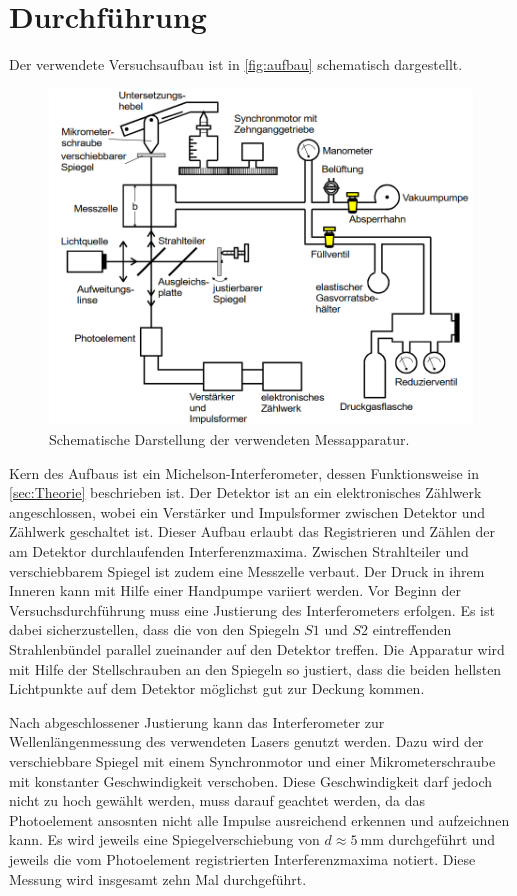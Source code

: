\section{Durchführung}
\label{sec:Durchführung}

Der verwendete Versuchsaufbau ist in \autoref{fig:aufbau} schematisch dargestellt.

\begin{figure}
    \centering
    \includegraphics[width=12cm]{content/aufbau.png}
    \caption{Schematische Darstellung der verwendeten Messapparatur. \cite{sample}}
    \label{fig:aufbau}
  \end{figure}

Kern des Aufbaus ist ein Michelson-Interferometer, dessen Funktionsweise in \autoref{sec:Theorie} beschrieben ist.
Der Detektor ist an ein elektronisches Zählwerk angeschlossen, wobei ein Verstärker und Impulsformer zwischen Detektor und 
Zählwerk geschaltet ist. Dieser Aufbau erlaubt das Registrieren und Zählen der am Detektor durchlaufenden Interferenzmaxima. 
Zwischen Strahlteiler und verschiebbarem Spiegel ist zudem eine Messzelle verbaut. Der Druck in ihrem Inneren kann mit Hilfe
einer Handpumpe variiert werden. 
Vor Beginn der Versuchsdurchführung muss eine Justierung des Interferometers erfolgen. Es ist dabei sicherzustellen,
dass die von den Spiegeln $S1$ und $S2$ eintreffenden Strahlenbündel parallel zueinander auf den Detektor treffen. 
Die Apparatur wird mit Hilfe der Stellschrauben an den Spiegeln so justiert, dass die beiden hellsten Lichtpunkte 
auf dem Detektor möglichst gut zur Deckung kommen. 

Nach abgeschlossener Justierung kann das Interferometer zur Wellenlängenmessung des verwendeten Lasers genutzt werden. 
Dazu wird der verschiebbare Spiegel mit einem Synchronmotor und einer Mikrometerschraube mit konstanter Geschwindigkeit 
verschoben. Diese Geschwindigkeit darf jedoch nicht zu hoch gewählt werden, muss darauf geachtet werden, da das Photoelement 
ansosnten nicht alle Impulse ausreichend erkennen und aufzeichnen kann. Es wird jeweils eine Spiegelverschiebung von 
$d \approx \SI{5}{\milli\meter}$ durchgeführt und jeweils die vom Photoelement registrierten Interferenzmaxima notiert.
Diese Messung wird insgesamt zehn Mal durchgeführt. 

